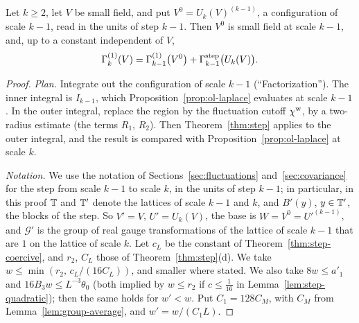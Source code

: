 \begin{lemma}\label{lem:ol-one-step}
Let $k\ge2$, let $V$ be small field, and put $V^0=U_k(V)^{(k-1)}$, a configuration of scale $k-1$, read in the units of step $k-1$. Then $V^0$ is small field at scale $k-1$, and, up to a constant independent of $V$,
\[
\Gamma^{(1)}_k(V)=\Gamma^{(1)}_{k-1}\big(V^0\big)+\Gamma^{\rm step}_{k-1}\big(U_k(V)\big).
\]
\end{lemma}

\begin{proof}
\emph{Plan.} Integrate out the configuration of scale $k-1$ (``Factorization''). The inner integral is $I_{k-1}$, which Proposition~\ref{prop:ol-laplace} evaluates at scale $k-1$. In the outer integral, replace the region by the fluctuation cutoff $\chi^{\rm w}$, by a two-radius estimate (the terms $R_1$, $R_2$). Then Theorem~\ref{thm:step} applies to the outer integral, and the result is compared with Proposition~\ref{prop:ol-laplace} at scale $k$.

\emph{Notation.} We use the notation of Sections~\ref{sec:fluctuations} and~\ref{sec:covariance} for the step from scale $k-1$ to scale $k$, in the units of step $k-1$; in particular, in this proof $\mathbb T$ and $\mathbb T'$ denote the lattices of scale $k-1$ and $k$, and $B'(y)$, $y\in\mathbb T'$, the blocks of the step. So $V'=V$, $U'=U_k(V)$, the base is $W=V^0=U'^{(k-1)}$, and $\mathcal G'$ is the group of real gauge transformations of the lattice of scale $k-1$ that are $1$ on the lattice of scale $k$. Let $c_L$ be the constant of Theorem~\ref{thm:step-coercive}, and $r_2$, $C_L$ those of Theorem~\ref{thm:step}(d). We take $w\le\min(r_2,\,c_L/(16C_L))$, and smaller where stated. We also take $8w\le a'_1$ and $16B_3w\le L^{-3}\theta_0$ (both implied by $w\le r_2$ if $c\le\frac1{16}$ in Lemma~\ref{lem:step-quadratic}); then the same holds for $w'<w$. Put $C_1=128C_M$, with $C_M$ from Lemma~\ref{lem:group-average}, and $w'=w/(C_1L)$.


\end{proof}
